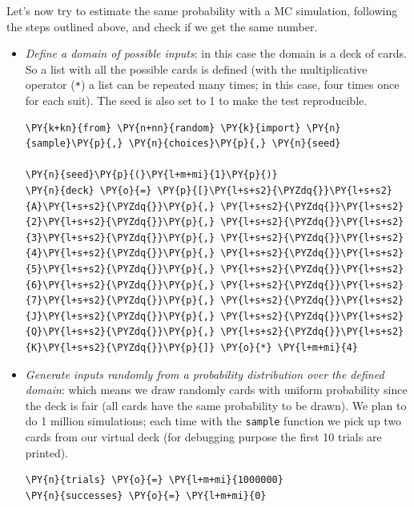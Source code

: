 Let's now try to estimate the same probability with a MC simulation, following
the steps outlined above, and check if we get the same number.
\begin{itemize}
\item \emph{Define a domain of possible inputs}: in this case the domain is a deck of cards. So a list with all the possible cards is defined (with the multiplicative operator (\texttt{*}) a list can be repeated many times; in this case, four times once for each suit). The seed is also set to 1 to make the
test reproducible.

\begin{codebox}[breakable, size=fbox, boxrule=1pt, pad at break*=1mm,colback=cellbackground, colframe=cellborder]
\begin{Verbatim}[commandchars=\\\{\}]
\PY{k+kn}{from} \PY{n+nn}{random} \PY{k}{import} \PY{n}{sample}\PY{p}{,} \PY{n}{choices}\PY{p}{,} \PY{n}{seed}

\PY{n}{seed}\PY{p}{(}\PY{l+m+mi}{1}\PY{p}{)}
\PY{n}{deck} \PY{o}{=} \PY{p}{[}\PY{l+s+s2}{\PYZdq{}}\PY{l+s+s2}{A}\PY{l+s+s2}{\PYZdq{}}\PY{p}{,} \PY{l+s+s2}{\PYZdq{}}\PY{l+s+s2}{2}\PY{l+s+s2}{\PYZdq{}}\PY{p}{,} \PY{l+s+s2}{\PYZdq{}}\PY{l+s+s2}{3}\PY{l+s+s2}{\PYZdq{}}\PY{p}{,} \PY{l+s+s2}{\PYZdq{}}\PY{l+s+s2}{4}\PY{l+s+s2}{\PYZdq{}}\PY{p}{,} \PY{l+s+s2}{\PYZdq{}}\PY{l+s+s2}{5}\PY{l+s+s2}{\PYZdq{}}\PY{p}{,} \PY{l+s+s2}{\PYZdq{}}\PY{l+s+s2}{6}\PY{l+s+s2}{\PYZdq{}}\PY{p}{,} \PY{l+s+s2}{\PYZdq{}}\PY{l+s+s2}{7}\PY{l+s+s2}{\PYZdq{}}\PY{p}{,} \PY{l+s+s2}{\PYZdq{}}\PY{l+s+s2}{J}\PY{l+s+s2}{\PYZdq{}}\PY{p}{,} \PY{l+s+s2}{\PYZdq{}}\PY{l+s+s2}{Q}\PY{l+s+s2}{\PYZdq{}}\PY{p}{,} \PY{l+s+s2}{\PYZdq{}}\PY{l+s+s2}{K}\PY{l+s+s2}{\PYZdq{}}\PY{p}{]} \PY{o}{*} \PY{l+m+mi}{4}
 \end{Verbatim}
\end{codebox}

\item \emph{Generate inputs randomly from a probability distribution over the defined domain}: which means we draw randomly cards with uniform probability since the deck is fair (all cards have the same probability to be drawn). 
We plan to do 1 million simulations; each time with the \texttt{sample} function we pick up two cards from our virtual deck (for debugging purpose the first 10 trials are printed).

\begin{codebox}[breakable, size=fbox, boxrule=1pt, pad at break*=1mm,colback=cellbackground, colframe=cellborder]
\begin{Verbatim}[commandchars=\\\{\}]
\PY{n}{trials} \PY{o}{=} \PY{l+m+mi}{1000000}
\PY{n}{successes} \PY{o}{=} \PY{l+m+mi}{0}


\end{Verbatim}
\end{codebox}
\end{itemize}

